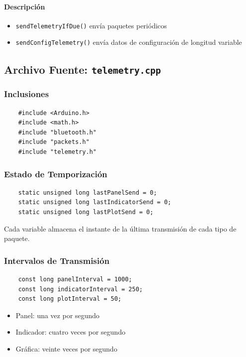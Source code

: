 \documentclass[12pt,a4paper]{article}
\newcommand{\ardfnDG}[1]{\texttt{\textcolor{arduinoTeal}{#1}}}
\newcommand{\ardfnOR}[1]{\texttt{\textcolor{arduinoOrange}{#1}}}
\begin{document}
\paragraph{Descripción}

\begin{itemize}
	\item \ardfnOR{sendTelemetryIfDue}\texttt{()} envía paquetes periódicos
	\item \ardfnOR{sendConfigTelemetry}\texttt{()} envía datos de configuración de longitud variable
\end{itemize}

\subsection{Archivo Fuente: \ardfnDG{telemetry.cpp}}

\subsubsection{Inclusiones}

\begin{lstlisting}
	#include <Arduino.h>
	#include <math.h>
	#include "bluetooth.h"
	#include "packets.h"
	#include "telemetry.h"
\end{lstlisting}

\subsubsection{Estado de Temporización}

\begin{lstlisting}
	static unsigned long lastPanelSend = 0;
	static unsigned long lastIndicatorSend = 0;
	static unsigned long lastPlotSend = 0;
\end{lstlisting}

Cada variable almacena el instante de la última transmisión de cada tipo de paquete.

\subsubsection{Intervalos de Transmisión}

\begin{lstlisting}
	const long panelInterval = 1000;
	const long indicatorInterval = 250;
	const long plotInterval = 50;
\end{lstlisting}

\begin{itemize}
	\item Panel: una vez por segundo
	\item Indicador: cuatro veces por segundo
	\item Gráfica: veinte veces por segundo
\end{itemize}
\end{document}
